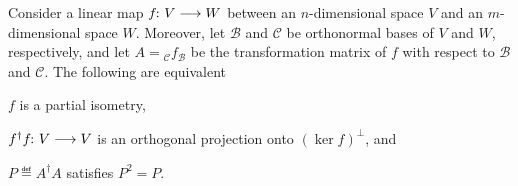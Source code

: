 \documentclass[a4paper, oneside, 12pt]{amsart}
\begin{document}
\begin{lemma}\label{lem:transformation-matrix-of-isometry}
  Consider a linear map \(f \from V\to W\) between an \(n\)-dimensional space \(V\) and an \(m\)-dimensional space \(W\).
  Moreover, let \(\mathcal{B}\) and \(\mathcal{C}\) be orthonormal bases of \(V\) and \(W\), respectively, and let \(A={}_{\mathcal{C}}f_{\mathcal{B}}\) be the transformation matrix of \(f\) with respect to \(\mathcal{B}\) and \(\mathcal{C}\).
  The following are equivalent
  \begin{thmlist}
    \item \(f\) is a partial isometry,
    \item \(f^{\dagger} f\from V\to V\) is an orthogonal projection onto \((\ker f)^{\perp}\), and
    \item  \(P \eqdef A^{\dagger}A\) satisfies \(P^{2} = P\).
  \end{thmlist}
\end{lemma}
\end{document}
